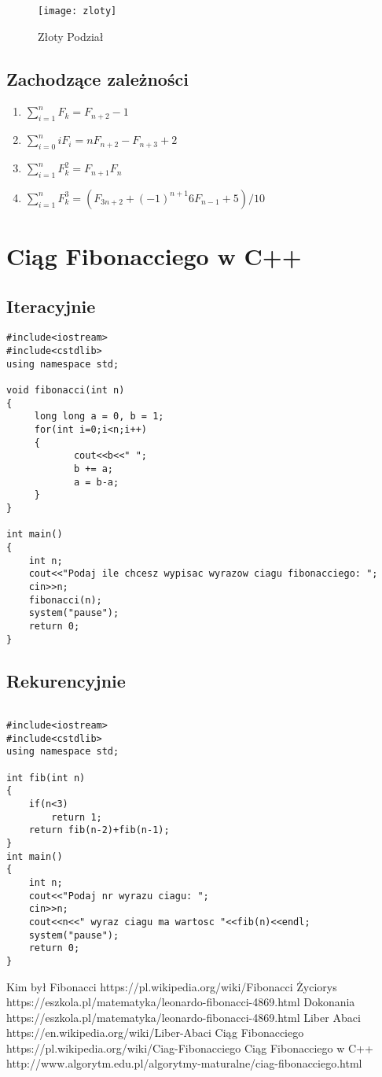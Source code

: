 \documentclass{report}
\begin{document}
\begin{figure}[h]

\texttt{[image: zloty]}
\caption{Złoty Podział}
\end{figure}
\newpage
\subsection{Zachodzące zależności}
\begin{enumerate}
\item $
\sum_{i=1}^{n} F_{k} = F_{n+2} - 1 \quad
	$
\item $
\sum_{i=0}^{n} iF_{i} = nF_{n+2} - F_{n+3} +2 \quad
	$
\item $
\sum_{i=1}^{n} F_{k}^{2} = F_{n+1}F_{n}\quad
	$
\item $
\sum_{i=1}^{n} F_{k}^{3} = (F_{3n+2} + (-1)^{n+1}6F_{n-1} + 5)/10 \quad
	$
\end{enumerate}
\section{Ciąg Fibonacciego w C++}
\subsection{Iteracyjnie}
\cite{fib6}
\begin{lstlisting}
#include<iostream>
#include<cstdlib>
using namespace std;

void fibonacci(int n)
{    
     long long a = 0, b = 1;
     for(int i=0;i<n;i++)
     {
            cout<<b<<" ";
            b += a;  
            a = b-a;  
     }     
}

int main()
{
    int n;
    cout<<"Podaj ile chcesz wypisac wyrazow ciagu fibonacciego: ";
    cin>>n;
    fibonacci(n);
    system("pause");
    return 0;
}
\end{lstlisting}
\newpage
\subsection{Rekurencyjnie}
\cite{fib6}
\begin{lstlisting}

#include<iostream>
#include<cstdlib>
using namespace std;

int fib(int n)
{
	if(n<3)
		return 1;
	return fib(n-2)+fib(n-1);
}
int main()
{
	int n;
	cout<<"Podaj nr wyrazu ciagu: ";
	cin>>n;
	cout<<n<<" wyraz ciagu ma wartosc "<<fib(n)<<endl;
	system("pause");
	return 0;
}
\end{lstlisting}
\newpage
\begin{thebibliography}{9}
 Kim był Fibonacci https://pl.wikipedia.org/wiki/Fibonacci
 Życiorys https://eszkola.pl/matematyka/leonardo-fibonacci-4869.html
 Dokonania https://eszkola.pl/matematyka/leonardo-fibonacci-4869.html
 Liber Abaci https://en.wikipedia.org/wiki/Liber-Abaci
 Ciąg Fibonacciego https://pl.wikipedia.org/wiki/Ciag-Fibonacciego
 Ciąg Fibonacciego w C++ http://www.algorytm.edu.pl/algorytmy-maturalne/ciag-fibonacciego.html
\end{thebibliography}
\listoffigures
\end{document}
